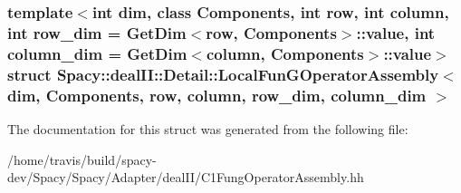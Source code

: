 \subsubsection*{template$<$int dim, class \-Components, int row, int column, int row\-\_\-dim = \-Get\-Dim$<$row, Components$>$\-::value, int column\-\_\-dim = \-Get\-Dim$<$column, Components$>$\-::value$>$ struct Spacy\-::deal\-I\-I\-::\-Detail\-::\-Local\-Fun\-G\-Operator\-Assembly$<$ dim, Components, row, column, row\-\_\-dim, column\-\_\-dim $>$}



\-The documentation for this struct was generated from the following file\-:\begin{DoxyCompactItemize}
\item 
/home/travis/build/spacy-\/dev/\-Spacy/\-Spacy/\-Adapter/deal\-I\-I/\-C1\-Fung\-Operator\-Assembly.\-hh\end{DoxyCompactItemize}
